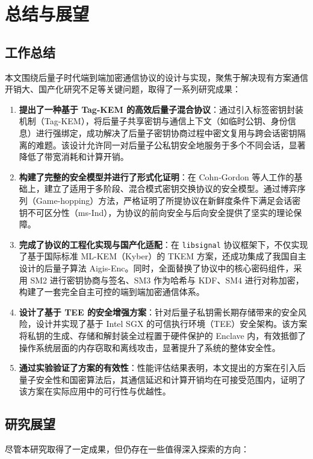 \chapter{总结与展望}\label{chap:conclusion}



\section{工作总结}
本文围绕后量子时代端到端加密通信协议的设计与实现，聚焦于解决现有方案通信开销大、国产化研究不足等关键问题，取得了一系列研究成果：

\begin{enumerate}
    \item \textbf{提出了一种基于 Tag-KEM 的高效后量子混合协议}：通过引入标签密钥封装机制（Tag-KEM），将后量子共享密钥与通信上下文（如临时公钥、身份信息）进行强绑定，成功解决了后量子密钥协商过程中密文复用与跨会话密钥隔离的难题。该设计允许同一对后量子公私钥安全地服务于多个不同会话，显著降低了带宽消耗和计算开销。

    \item \textbf{构建了完整的安全模型并进行了形式化证明}：在 Cohn-Gordon 等人工作的基础上，建立了适用于多阶段、混合模式密钥交换协议的安全模型。通过博弈序列（Game-hopping）方法，严格证明了所提协议在新鲜度条件下满足会话密钥不可区分性（ms-Ind），为协议的前向安全与后向安全提供了坚实的理论保障。

    \item \textbf{完成了协议的工程化实现与国产化适配}：在 \texttt{libsignal} 协议框架下，不仅实现了基于国际标准 ML-KEM（Kyber）的 TKEM 方案，还成功集成了我国自主设计的后量子算法 Aigis-Enc。同时，全面替换了协议中的核心密码组件，采用 SM2 进行密钥协商与签名、SM3 作为哈希与 KDF、SM4 进行对称加密，构建了一套完全自主可控的端到端加密通信体系。

    \item \textbf{设计了基于 TEE 的安全增强方案}：针对后量子私钥需长期存储带来的安全风险，设计并实现了基于 Intel SGX 的可信执行环境（TEE）安全架构。该方案将私钥的生成、存储和解封装全过程置于硬件保护的 Enclave 内，有效抵御了操作系统层面的内存窃取和离线攻击，显著提升了系统的整体安全性。

    \item \textbf{通过实验验证了方案的有效性}：性能评估结果表明，本文提出的方案在引入后量子安全性和国密算法后，其通信延迟和计算开销均在可接受范围内，证明了该方案在实际应用中的可行性与优越性。
\end{enumerate}

\section{研究展望}
尽管本研究取得了一定成果，但仍存在一些值得深入探索的方向：

